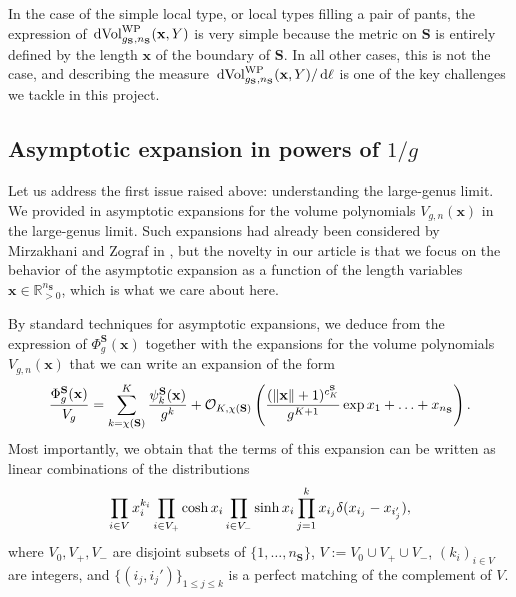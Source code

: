 \documentclass[12pt,twoside]{article}
\theoremstyle{theorem}
\theoremstyle{remark}
\theoremstyle{definition}
\theoremstyle{example}
\newcommand{\R}{\mathbb{R}}
\renewcommand{\d}{\, \mathrm{d}}
\newcommand{\x}{\mathbf{x}}
\newcommand{\1}[1]{\mathds{1}_{#1}}
\let\div\relax
\newcommand{\div}[1]{\left(\frac{#1}{2}\right)}
\newcommand{\Sf}{\mathbf{S}}
\newcommand{\g}{g_{\mathbf{S}}}
\newcommand{\n}{n_{\mathbf{S}}}
\newcommand{\Volwp}[1][g]{\mathrm{Vol}_{#1}^{\mathrm{\scriptsize{WP}}}}
\newcommand{\ord}{K}
\begin{document}
In the case of the simple local type, or local types filling a pair of pants, the expression of
$\d \Volwp[\g,\n](\x,Y)$ is very simple because the metric on $\Sf$ is entirely defined by the
length $\x$ of the boundary of $\Sf$. In all other cases, this is not the case, and describing the
measure $\d \Volwp[\g,\n](\x,Y)/\d \ell$ is one of the key challenges we tackle in this project.

\subsection{Asymptotic expansion in powers of $1/g$}
\label{sec:asympt-expans-powers}

Let us address the first issue raised above: understanding the large-genus limit. We provided in
\cite{anantharaman2022} asymptotic expansions for the volume polynomials $V_{g,n}(\x)$ in the
large-genus limit. Such expansions had already been considered by Mirzakhani and Zograf in
\cite{mirzakhani2015}, but the novelty in our article is that we focus on the behavior of the
asymptotic expansion as a function of the length variables $\x \in \R_{>0}^{\n}$, which is what we care
about here.

By standard techniques for asymptotic expansions, we deduce from the expression of $\Phi_g^\Sf(\x)$
together with the expansions for the volume polynomials $V_{g,n}(\x)$ that we can write an expansion
of the form
  \begin{equation}
    \label{e:claim_exp_phi_T}
    \frac{\Phi_g^\Sf(\x)}{V_g} = \sum_{k=\chi(\Sf)}^\ord \frac{\psi_k^\Sf(\x)}{g^k}
    + \mathcal{O}_{\ord,\chi(\Sf)}
    \left(\frac{(\|\x\|+1)^{c_\ord^\Sf}}{g^{\ord+1}} \exp{\div{x_1+\ldots+x_{\n}}}\right).
  \end{equation}
Most importantly, we obtain that the terms of this expansion can be written as linear combinations
of the distributions
\begin{equation}
  \label{eq:form_coeff_phi}
  \prod_{i \in V} x_i^{k_i}
  \prod_{i \in V_+} \cosh \div{x_i}
  \prod_{i \in V_-} \sinh \div{x_i}
  \prod_{j=1}^k x_{i_j} \delta(x_{i_j}-x_{i_j'}),
  \end{equation}
  where $V_0, V_+, V_-$ are disjoint subsets of $\{1, \ldots, \n\}$, $V:=V_0 \cup V_+ \cup V_-$,
  $(k_i)_{i \in V}$ are integers, and $\{(i_j,i_j')\}_{1 \leq j \leq k}$ is a perfect matching of
  the complement of $V$.
  
\end{document}
